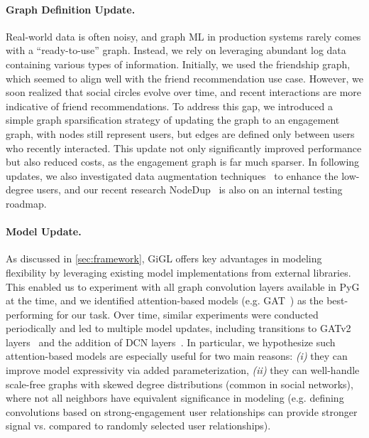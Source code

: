 \paragraph{Graph Definition Update.} 
Real-world data is often noisy, and graph ML in  production systems rarely comes with a ``ready-to-use'' graph. Instead, we rely on leveraging abundant log data containing various types of information.
Initially, we used the friendship graph, which seemed to align well with the friend recommendation use case. 
However, we soon realized that social circles evolve over time, and recent interactions are more indicative of friend recommendations. To address this gap, we introduced a simple graph sparsification strategy of updating the graph to an engagement graph, with nodes still represent users, but edges are defined only between users who recently interacted. This update not only significantly improved performance but also reduced costs, as the engagement graph is far much sparser. In following updates, we also investigated data augmentation techniques~\citep{zhao2021data,zhao2022graph} to enhance the low-degree users, and our recent research NodeDup~\citep{guo2024node} is also on an internal testing roadmap.

\paragraph{Model Update.} 
As discussed in \cref{sec:framework}, GiGL offers key advantages in modeling flexibility by leveraging existing model implementations from external libraries. This enabled us to experiment with all graph convolution layers available in PyG at the time, and we identified attention-based models (e.g. GAT~\citep{velivckovic2017graph}) as the best-performing for our task. 
Over time, similar experiments were conducted periodically and led to multiple model updates, including transitions to GATv2 layers~\citep{brody2021attentive} and the addition of DCN layers~\citep{wang2017deep}. In particular, we hypothesize such attention-based models are especially useful for two main reasons: \emph{(i)} they can improve model expressivity via added parameterization, \emph{(ii)} they can well-handle scale-free graphs with skewed degree distributions (common in social networks), where not all neighbors have equivalent significance in modeling (e.g. defining convolutions based on strong-engagement user relationships can provide stronger signal vs. compared to randomly selected user relationships).

